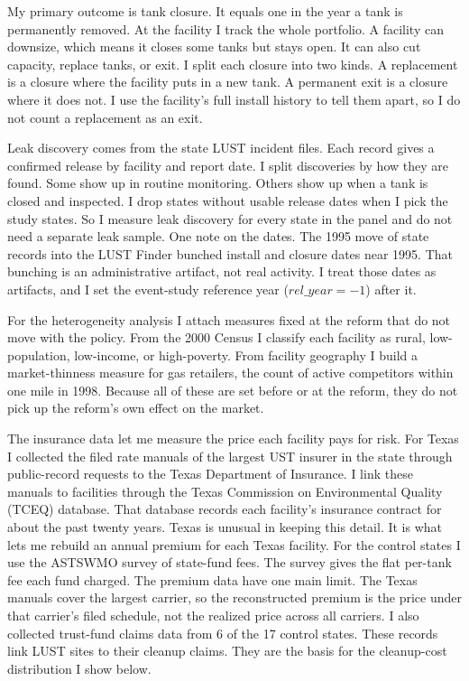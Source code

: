 \documentclass[
  12pt,
]{article}
\begin{document}
My primary outcome is tank closure. It equals one in the year a tank is
permanently removed. At the facility I track the whole portfolio. A
facility can downsize, which means it closes some tanks but stays open.
It can also cut capacity, replace tanks, or exit. I split each closure
into two kinds. A replacement is a closure where the facility puts in a
new tank. A permanent exit is a closure where it does not. I use the
facility's full install history to tell them apart, so I do not count a
replacement as an exit.

Leak discovery comes from the state LUST incident files. Each record
gives a confirmed release by facility and report date. I split
discoveries by how they are found. Some show up in routine monitoring.
Others show up when a tank is closed and inspected. I drop states
without usable release dates when I pick the study states. So I measure
leak discovery for every state in the panel and do not need a separate
leak sample. One note on the dates. The 1995 move of state records into
the LUST Finder bunched install and closure dates near 1995. That
bunching is an administrative artifact, not real activity. I treat those
dates as artifacts, and I set the event-study reference year
(\(rel\_year = -1\)) after it.

For the heterogeneity analysis I attach measures fixed at the reform
that do not move with the policy. From the 2000 Census I classify each
facility as rural, low-population, low-income, or high-poverty. From
facility geography I build a market-thinness measure for gas retailers,
the count of active competitors within one mile in 1998. Because all of
these are set before or at the reform, they do not pick up the reform's
own effect on the market.

The insurance data let me measure the price each facility pays for risk.
For Texas I collected the filed rate manuals of the largest UST insurer
in the state through public-record requests to the Texas Department of
Insurance. I link these manuals to facilities through the Texas
Commission on Environmental Quality (TCEQ) database. That database
records each facility's insurance contract for about the past twenty
years. Texas is unusual in keeping this detail. It is what lets me
rebuild an annual premium for each Texas facility. For the control
states I use the ASTSWMO survey of state-fund fees. The survey gives the
flat per-tank fee each fund charged. The premium data have one main
limit. The Texas manuals cover the largest carrier, so the reconstructed
premium is the price under that carrier's filed schedule, not the
realized price across all carriers. I also collected trust-fund claims
data from 6 of the 17 control states. These records link LUST sites to
their cleanup claims. They are the basis for the cleanup-cost
distribution I show below.
\end{document}
